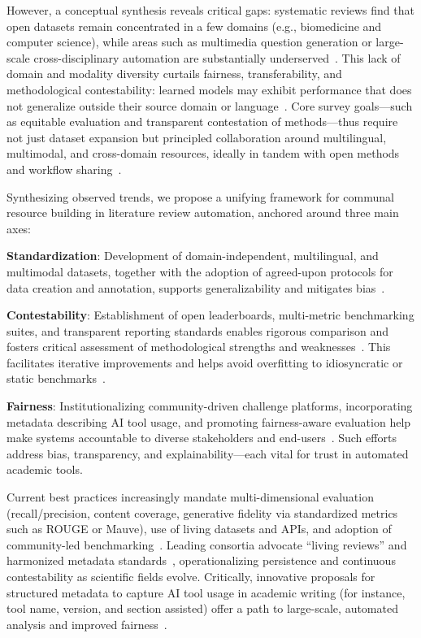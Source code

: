 \documentclass[sigconf]{acmart}
\begin{document}
However, a conceptual synthesis reveals critical gaps: systematic reviews find that open datasets remain concentrated in a few domains (e.g., biomedicine and computer science), while areas such as multimedia question generation or large-scale cross-disciplinary automation are substantially underserved~\cite{ref26,ref27,ref33,ref35,ref100}. This lack of domain and modality diversity curtails fairness, transferability, and methodological contestability: learned models may exhibit performance that does not generalize outside their source domain or language~\cite{ref31,ref33,ref34,ref84,ref100,ref104,ref106}. Core survey goals—such as equitable evaluation and transparent contestation of methods—thus require not just dataset expansion but principled collaboration around multilingual, multimodal, and cross-domain resources, ideally in tandem with open methods and workflow sharing~\cite{ref34,ref32,ref102,ref106}.

Synthesizing observed trends, we propose a unifying framework for communal resource building in literature review automation, anchored around three main axes:

\textbf{Standardization}: Development of domain-independent, multilingual, and multimodal datasets, together with the adoption of agreed-upon protocols for data creation and annotation, supports generalizability and mitigates bias~\cite{ref100,ref104,ref106}.

\textbf{Contestability}: Establishment of open leaderboards, multi-metric benchmarking suites, and transparent reporting standards enables rigorous comparison and fosters critical assessment of methodological strengths and weaknesses~\cite{ref32,ref33,ref68,ref80,ref104}. This facilitates iterative improvements and helps avoid overfitting to idiosyncratic or static benchmarks~\cite{ref78,ref104}.

\textbf{Fairness}: Institutionalizing community-driven challenge platforms, incorporating metadata describing AI tool usage, and promoting fairness-aware evaluation help make systems accountable to diverse stakeholders and end-users~\cite{ref100,ref104,ref106,ref98}. Such efforts address bias, transparency, and explainability—each vital for trust in automated academic tools.

Current best practices increasingly mandate multi-dimensional evaluation (recall/precision, content coverage, generative fidelity via standardized metrics such as ROUGE or Mauve), use of living datasets and APIs, and adoption of community-led benchmarking~\cite{ref31,ref32,ref33,ref68,ref78,ref80,ref102,ref104,ref106}. Leading consortia advocate “living reviews” and harmonized metadata standards~\cite{ref35,ref68,ref78,ref106}, operationalizing persistence and continuous contestability as scientific fields evolve. Critically, innovative proposals for structured metadata to capture AI tool usage in academic writing (for instance, tool name, version, and section assisted) offer a path to large-scale, automated analysis and improved fairness~\cite{ref106}.
\end{document}

